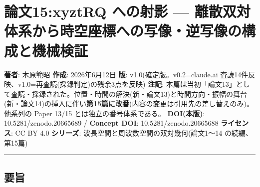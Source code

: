 \documentclass[
]{ltjsarticle}
\author{}
\date{}
\begin{document}
\section{論文15:xyztRQ への射影 ---
離散双対体系から時空座標への写像・逆写像の構成と機械検証}\label{ux8ad6ux658715xyztrq-ux3078ux306eux5c04ux5f71-ux96e2ux6563ux53ccux5bfeux4f53ux7cfbux304bux3089ux6642ux7a7aux5ea7ux6a19ux3078ux306eux5199ux50cfux9006ux5199ux50cfux306eux69cbux6210ux3068ux6a5fux68b0ux691cux8a3c}

\textbf{著者}: 木原範昭 \textbf{作成}: 2026年6月12日 \textbf{版}:
v1.0(確定版。v0.2=claude.ai
査読14件反映、v1.0=再査読(採録判定)の残余3点を反映) \textbf{注記}:
本篇は当初「論文13」として査読・採録された。位置・時間の解決(新・論文13)と時間方向・振幅の舞台(新・論文14)の挿入に伴い\textbf{第15篇に改番}(内容の変更は引用先の差し替えのみ)。他系列の
Paper 13/15 とは独立の番号体系である。 \textbf{DOI(本版)}:
10.5281/zenodo.20665689 / \textbf{Concept DOI}: 10.5281/zenodo.20665688
\textbf{ライセンス}: CC BY 4.0 \textbf{シリーズ}:
波長空間と周波数空間の双対幾何(論文1〜14 の続編、第15篇)

\begin{center}\rule{0.5\linewidth}{0.5pt}\end{center}

\subsection{要旨}\label{ux8981ux65e8}
\end{document}
